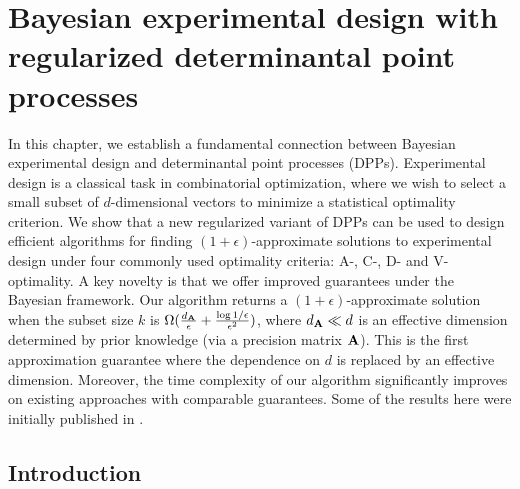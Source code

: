 \documentclass[../../thesis.tex]{subfiles}
\begin{document}
%




\chapter{Bayesian experimental design with regularized determinantal point processes}
\label{ch:design}

In this chapter, we establish a fundamental connection between Bayesian
experimental design and determinantal point processes
(DPPs). Experimental design is a classical task in combinatorial
optimization, where we wish to select a small subset of $d$-dimensional
vectors to minimize a statistical optimality criterion.
We show that a new regularized variant of
DPPs can be used to design
efficient algorithms for finding $(1+\epsilon)$-approximate solutions
to experimental design under four commonly used optimality
criteria: A-, C-, D- and V-optimality. A key novelty is that we offer
improved guarantees under the Bayesian framework.
Our algorithm returns a $(1+\epsilon)$-approximate solution when the
subset size $k$ is
$\Omega(\frac{d_{\mathbf A}}{\epsilon} + \frac{\log
    1/\epsilon}{\epsilon^2})$, where $d_{\mathbf A}\ll d$ is an effective dimension
determined by prior knowledge (via a precision matrix $\mathbf A$). This is the first
approximation guarantee where the dependence on $d$ is
replaced by an effective dimension. Moreover, the time complexity
of our algorithm significantly improves on existing approaches
with comparable guarantees. Some of the results here were initially
published in .


\section{Introduction}
\end{document}
